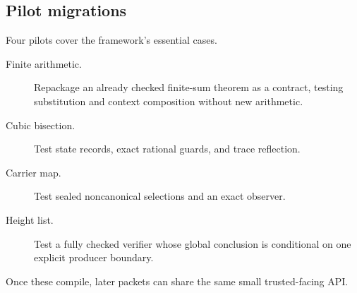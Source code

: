\subsection{Pilot migrations}

Four pilots cover the framework's essential cases.

\begin{description}
\item[Finite arithmetic.]  Repackage an already checked finite-sum theorem as a
contract, testing substitution and context composition without new arithmetic.
\item[Cubic bisection.]  Test state records, exact rational guards, and trace
reflection.
\item[Carrier map.]  Test sealed noncanonical selections and an exact observer.
\item[Height list.]  Test a fully checked verifier whose global conclusion is
conditional on one explicit producer boundary.
\end{description}
Once these compile, later packets can share the same small trusted-facing API.
